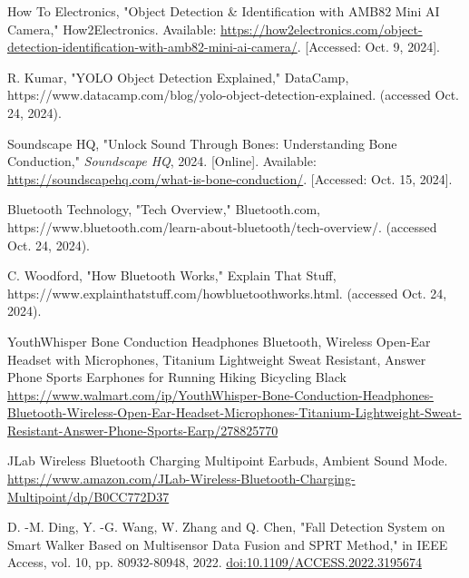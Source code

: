 \begin{thebibliography}{45}
	 How To Electronics, "Object Detection \& Identification with AMB82 Mini AI Camera," How2Electronics. Available: \href{https://how2electronics.com/object-detection-identification-with-amb82-mini-ai-camera/}{https://how2electronics.com/object-detection-identification-with-amb82-mini-ai-camera/}. [Accessed: Oct. 9, 2024].
	
	 R. Kumar, "YOLO Object Detection Explained," DataCamp, https://www.datacamp.com/blog/yolo-object-detection-explained. (accessed Oct. 24, 2024).
	
	 Soundscape HQ, "Unlock Sound Through Bones: Understanding Bone Conduction," \emph{Soundscape HQ}, 2024. [Online]. Available: \href{https://soundscapehq.com/what-is-bone-conduction/}{https://soundscapehq.com/what-is-bone-conduction/}. [Accessed: Oct. 15, 2024].

	 Bluetooth Technology, "Tech Overview," Bluetooth.com, https://www.bluetooth.com/learn-about-bluetooth/tech-overview/. (accessed Oct. 24, 2024).
	
	 C. Woodford, "How Bluetooth Works," Explain That Stuff, https://www.explainthatstuff.com/howbluetoothworks.html. (accessed Oct. 24, 2024).

	 YouthWhisper Bone Conduction Headphones Bluetooth, Wireless Open-Ear Headset with Microphones, Titanium Lightweight Sweat Resistant, Answer Phone Sports Earphones for Running Hiking Bicycling Black \href{https://www.walmart.com/ip/YouthWhisper-Bone-Conduction-Headphones-Bluetooth-Wireless-Open-Ear-Headset-Microphones-Titanium-Lightweight-Sweat-Resistant-Answer-Phone-Sports-Earp/278825770?clickid=WjORv5UqyxyKRJqTvVUblVgLUkCRR\%3AxQe1ri}{https://www.walmart.com/ip/YouthWhisper-Bone-Conduction-Headphones-Bluetooth-Wireless-Open-Ear-Headset-Microphones-Titanium-Lightweight-Sweat-Resistant-Answer-Phone-Sports-Earp/278825770}
	
	 JLab Wireless Bluetooth Charging Multipoint Earbuds, Ambient Sound Mode. \href{https://www.amazon.com/JLab-Wireless-Bluetooth-Charging-Multipoint/dp/B0CC772D37}{https://www.amazon.com/JLab-Wireless-Bluetooth-Charging-Multipoint/dp/B0CC772D37}
	
	 D. -M. Ding, Y. -G. Wang, W. Zhang and Q. Chen, "Fall Detection System on Smart Walker Based on Multisensor Data Fusion and SPRT Method," in IEEE Access, vol. 10, pp. 80932-80948, 2022. \href{https://doi.org/10.1109/ACCESS.2022.3195674}{doi:10.1109/ACCESS.2022.3195674}
	

\end{thebibliography}
